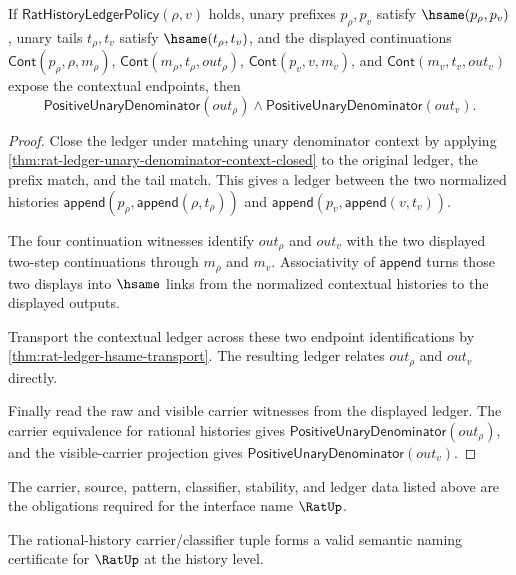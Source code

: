 \begin{theorem}
\label{thm:rat-history-ledger-cont-unary-context-positive-denominators}
If $\mathsf{RatHistoryLedgerPolicy}(\rho,v)$ holds, unary prefixes
$p_\rho,p_v$ satisfy $\hsame(p_\rho,p_v)$, unary tails $t_\rho,t_v$ satisfy
$\hsame(t_\rho,t_v)$, and the displayed continuations
$\mathsf{Cont}(p_\rho,\rho,m_\rho)$,
$\mathsf{Cont}(m_\rho,t_\rho,out_\rho)$,
$\mathsf{Cont}(p_v,v,m_v)$, and
$\mathsf{Cont}(m_v,t_v,out_v)$ expose the contextual endpoints, then
$$
\mathsf{PositiveUnaryDenominator}(out_\rho)\land
\mathsf{PositiveUnaryDenominator}(out_v).
$$
\end{theorem}
\begin{proof}
Close the ledger under matching unary denominator context by applying
\autoref{thm:rat-ledger-unary-denominator-context-closed} to the original
ledger, the prefix match, and the tail match. This gives a ledger between the
two normalized histories
$\mathsf{append}(p_\rho,\mathsf{append}(\rho,t_\rho))$ and
$\mathsf{append}(p_v,\mathsf{append}(v,t_v))$.

The four continuation witnesses identify $out_\rho$ and $out_v$ with the
two displayed two-step continuations through $m_\rho$ and $m_v$. Associativity
of $\mathsf{append}$ turns those two displays into $\hsame$ links from the
normalized contextual histories to the displayed outputs.

Transport the contextual ledger across these two endpoint identifications by
\autoref{thm:rat-ledger-hsame-transport}. The resulting ledger relates
$out_\rho$ and $out_v$ directly.

Finally read the raw and visible carrier witnesses from the displayed ledger.
The carrier equivalence for rational histories gives
$\mathsf{PositiveUnaryDenominator}(out_\rho)$, and the visible-carrier
projection gives $\mathsf{PositiveUnaryDenominator}(out_v)$.
\end{proof}

\begin{definition}
\label{def:rat-certificate-obligations}
The carrier, source, pattern, classifier, stability, and ledger data listed above are the obligations required for the interface name \(\RatUp\).
\end{definition}

\begin{theorem}
\label{thm:concrete-rat-namecert}
The rational-history carrier/classifier tuple forms a valid semantic naming certificate for $\RatUp$ at the history level.
\end{theorem}

